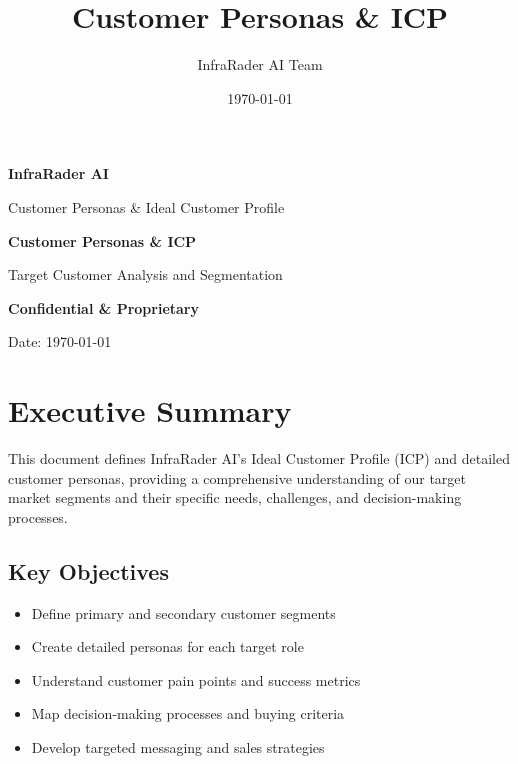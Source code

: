 \documentclass[business]{../templates/infraradar-main}
\title{Customer Personas \& ICP}
\author{InfraRader AI Team}
\date{\today}
\begin{document}
\begin{titlepage}
    \centering
    \vspace*{2cm}
    
    {\Huge\bfseries\color{infraradar@primary} InfraRader AI\par}
    \vspace{0.5cm}
    {\Large\color{infraradar@text} Customer Personas \& Ideal Customer Profile\par}
    \vspace{2cm}
    
    {\huge\bfseries Customer Personas \& ICP\par}
    \vspace{1cm}
    
    {\large Target Customer Analysis and Segmentation\par}
    \vspace{2cm}
    
    {\large\bfseries\color{infraradar@primary} Confidential \& Proprietary\par}
    {\large Date: \today\par}
    
\end{titlepage}

\tableofcontents
\newpage

\section{Executive Summary}

This document defines InfraRader AI's Ideal Customer Profile (ICP) and detailed customer personas, providing a comprehensive understanding of our target market segments and their specific needs, challenges, and decision-making processes.

\subsection{Key Objectives}
\begin{itemize}
    \item Define primary and secondary customer segments
    \item Create detailed personas for each target role
    \item Understand customer pain points and success metrics
    \item Map decision-making processes and buying criteria
    \item Develop targeted messaging and sales strategies
\end{itemize}
\end{document}
